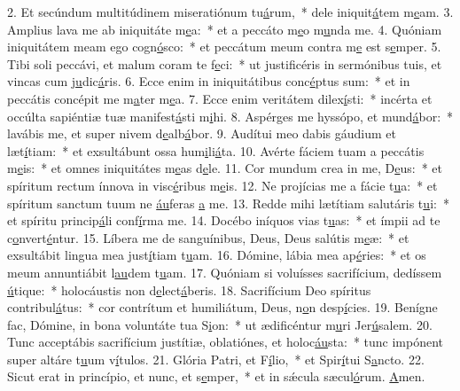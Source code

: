 2. Et secúndum multitúdinem miseratiónum tu\uline{á}rum,~* dele iniquit\uline{á}tem m\uline{e}am.
3. Amplius lava me ab iniquitáte m\uline{e}a:~* et a peccáto m\uline{e}o m\uline{u}nda me.
4. Quóniam iniquitátem meam ego cogn\uline{ó}sco:~* et peccátum meum contra m\uline{e} est s\uline{e}mper.
5. Tibi soli peccávi, et malum coram te f\uline{e}ci:~* ut justificéris in sermónibus tuis, et vincas cum j\uline{u}dic\uline{á}ris.
6. Ecce enim in iniquitátibus conc\uline{é}ptus sum:~* et in peccátis concépit me m\uline{a}ter m\uline{e}a.
7. Ecce enim veritátem dilex\uline{í}sti:~* incérta et occúlta sapiéntiæ tuæ manifest\uline{á}sti m\uline{i}hi.
8. Aspérges me hyssópo, et mund\uline{á}bor:~* lavábis me, et super nivem d\uline{e}alb\uline{á}bor.
9. Audítui meo dabis gáudium et læt\uline{í}tiam:~* et exsultábunt ossa hum\uline{i}li\uline{á}ta.
10. Avérte fáciem tuam a peccátis m\uline{e}is:~* et omnes iniquitátes m\uline{e}as d\uline{e}le.
11. Cor mundum crea in me, D\uline{e}us:~* et spíritum rectum ínnova in visc\uline{é}ribus m\uline{e}is.
12. Ne projícias me a fácie t\uline{u}a:~* et spíritum sanctum tuum ne \uline{áu}feras \uline{a} me.
13. Redde mihi lætítiam salutáris t\uline{u}i:~* et spíritu princip\uline{á}li conf\uline{í}rma me.
14. Docébo iníquos vias t\uline{u}as:~* et ímpii ad te c\uline{o}nvert\uline{é}ntur.
15. Líbera me de sanguínibus, Deus, Deus salútis m\uline{e}æ:~* et exsultábit lingua mea just\uline{í}tiam t\uline{u}am.
16. Dómine, lábia mea ap\uline{é}ries:~* et os meum annuntiábit l\uline{au}dem t\uline{u}am.
17. Quóniam si voluísses sacrifícium, dedíssem \uline{ú}tique:~* holocáustis non d\uline{e}lect\uline{á}beris.
18. Sacrifícium Deo spíritus contribul\uline{á}tus:~* cor contrítum et humiliátum, Deus, n\uline{o}n desp\uline{í}cies.
19. Benígne fac, Dómine, in bona voluntáte tua S\uline{i}on:~* ut ædificéntur m\uline{u}ri Jer\uline{ú}salem.
20. Tunc acceptábis sacrifícium justítiæ, oblatiónes, et holoc\uline{áu}sta:~* tunc impónent super altáre t\uline{u}um v\uline{í}tulos.
21. Glória Patri, et F\uline{í}lio,~* et Spir\uline{í}tui S\uline{a}ncto.
22. Sicut erat in princípio, et nunc, et s\uline{e}mper,~* et in sǽcula sæcul\uline{ó}rum. \uline{A}men.
